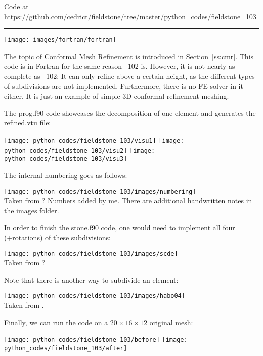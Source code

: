 

\begin{center}
Code at \url{https://github.com/cedrict/fieldstone/tree/master/python_codes/fieldstone_103}
\end{center}

\par\noindent\rule{\textwidth}{0.4pt}


\begin{center}
\texttt{[image: images/fortran/fortran]} 
\end{center}

The topic of Conformal Mesh Refinement is introduced in Section~\ref{ss:cmr}.
This code is in Fortran for the same reason \stone~102 is. 
However, it is not nearly as complete as \stone~102: It can only refine 
above a certain height, as the different types of subdivisions are not implemented.
Furthermore, there is no FE solver in it either. It is just an example of 
simple 3D conformal refinement meshing.

The {\filenamefont prog.f90} code showcases the decomposition of one element and generates
the {\filenamefont refined.vtu} file:
\begin{center}
\texttt{[image: python\_codes/fieldstone\_103/visu1]}
\texttt{[image: python\_codes/fieldstone\_103/visu2]}
\texttt{[image: python\_codes/fieldstone\_103/visu3]}
\end{center}
The internal numbering goes as follows:
\begin{center}
\texttt{[image: python\_codes/fieldstone\_103/images/numbering]}\\
{\captionfont Taken from ? Numbers added by me. There are additional handwritten notes
in the images folder.}
\end{center}

In order to finish the {\filenamefont stone.f90} code, one would need to 
implement all four (+rotations) of these subdivisions:
\begin{center}
\texttt{[image: python\_codes/fieldstone\_103/images/scde]}\\
{\captionfont Taken from ?}
\end{center}

Note that there is another way to subdivide an element:
\begin{center}
\texttt{[image: python\_codes/fieldstone\_103/images/habo04]}\\
{\captionfont Taken from \cite{habo04}.}
\end{center}

Finally, we can run the code on a $20\times16\times12$ original mesh:
\begin{center}
\texttt{[image: python\_codes/fieldstone\_103/before]}
\texttt{[image: python\_codes/fieldstone\_103/after]}
\end{center}

